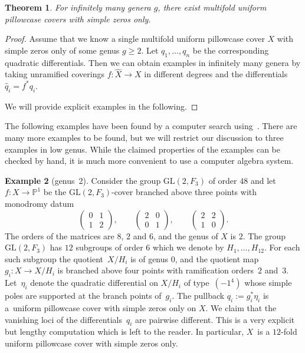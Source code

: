 \documentclass[pdftex]{sigma}
\numberwithin{equation}{section}
\newtheorem{theo}{Theorem}[section]
\theoremstyle{definition}
\newtheorem{exam}[theo]{Example}
\renewcommand{\to}{\rightarrow}
\newcommand{\PP}{\mathbb{P}}
\newcommand{\GL}{\mathrm{GL}}
\begin{document}
\begin{theo}\label{theo:multifold_pillow}
	For infinitely many genera $g$, there exist multifold uniform pillowcase covers with simple zeros only.
\end{theo}
\begin{proof}
	Assume that we know a single multifold uniform pillowcase cover $X$ with simple zeros only of some genus $g \geq 2$.
	Let $q_1, \dots, q_n$ be the corresponding quadratic differentials.
	Then we can obtain examples in infinitely many genera by taking unramified coverings $f\colon \widehat X \to X$ in different degrees and the differentials $\widehat q_i = f^* q_i$.

We will provide explicit examples in the following.
\end{proof}

The following examples have been found by a computer search using~\cite{GAP4}. There are many more examples to be found, but we will restrict our discussion to three examples in low genus.
While the claimed properties of the examples can be checked by hand, it is much more convenient to use a computer algebra system.

\begin{exam}[genus~2]
Consider the group $\GL(2,F_3)$ of order $48$ and let $f\colon X\to \PP^1$ be the $\GL(2, F_3)$-cover branched above three points with monodromy datum
\[
	\begin{pmatrix}0&1\\1&2\end{pmatrix}, \qquad
	\begin{pmatrix}2&0\\0&1\end{pmatrix}, \qquad
	\begin{pmatrix}2&2\\1&0\end{pmatrix}.
\]
The orders of the matrices are $8$, $2$ and $6$, and the genus of $X$ is $2$.
The group $\GL(2,F_3)$ has $12$ subgroups of order $6$ which we denote by $H_1, \dots, H_{12}$.
For each such subgroup the quotient~$X/H_i$ is of genus $0$, and the quotient map $g_i\colon X \to X/H_i$ is branched above four points with ramification orders~$2$ and~$3$.
Let~$\eta_i$ denote the quadratic differential on $X/H_i$ of type~$(-1^4)$ whose simple poles are supported at the branch points of~$g_i$.
The pullback $q_i := g_i^*\eta_i$ is a~uniform pillowcase cover with simple zeros only on $X$.
We claim that the vanishing loci of the differentials~$q_i$ are pairwise different. This is a very explicit but lengthy computation which is left to the reader.
In particular, $X$~is a $12$-fold uniform pillowcase cover with simple zeros only. 	
\end{exam}
\end{document}
